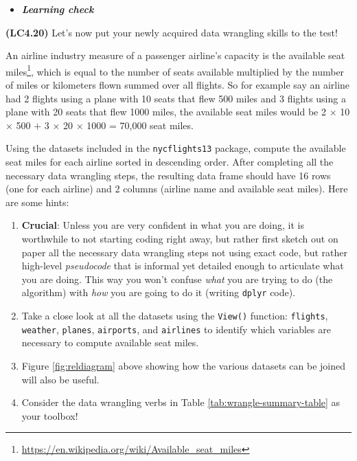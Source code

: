 \documentclass[12pt, krantz2,]{krantz}
\providecommand{\tightlist}{%
  \setlength{\itemsep}{0pt}\setlength{\parskip}{0pt}}
\renewcommand{\href}[2]{#2\footnote{\url{#1}}}
\newenvironment{rmdblock}[1]
  {\begin{shaded*}
  \begin{itemize}
  \renewcommand{\labelitemi}{
    \raisebox{-.7\height}[0pt][0pt]{
    }
  }
  \item
  }
  {
  \end{itemize}
  \end{shaded*}
  }
\newenvironment{learncheck}
  {\begin{rmdblock}{warning}}
  {\end{rmdblock}}
\begin{document}
\begin{learncheck}
\textbf{\emph{Learning check}}
\end{learncheck}

\textbf{(LC4.20)} Let's now put your newly acquired data wrangling skills to the test!

An airline industry measure of a passenger airline's capacity is the \href{https://en.wikipedia.org/wiki/Available_seat_miles}{available seat miles}, which is equal to the number of seats available multiplied by the number of miles or kilometers flown summed over all flights. So for example say an airline had 2 flights using a plane with 10 seats that flew 500 miles and 3 flights using a plane with 20 seats that flew 1000 miles, the available seat miles would be 2 \(\times\) 10 \(\times\) 500 \(+\) 3 \(\times\) 20 \(\times\) 1000 = 70,000 seat miles.

Using the datasets included in the \texttt{nycflights13} package, compute the available seat miles for each airline sorted in descending order. After completing all the necessary data wrangling steps, the resulting data frame should have 16 rows (one for each airline) and 2 columns (airline name and available seat miles). Here are some hints:

\begin{enumerate}
\def\labelenumi{\arabic{enumi}.}
\tightlist
\item
  \textbf{Crucial}: Unless you are very confident in what you are doing, it is worthwhile to not starting coding right away, but rather first sketch out on paper all the necessary data wrangling steps not using exact code, but rather high-level \emph{pseudocode} that is informal yet detailed enough to articulate what you are doing. This way you won't confuse \emph{what} you are trying to do (the algorithm) with \emph{how} you are going to do it (writing \texttt{dplyr} code).
\item
  Take a close look at all the datasets using the \texttt{View()} function: \texttt{flights}, \texttt{weather}, \texttt{planes}, \texttt{airports}, and \texttt{airlines} to identify which variables are necessary to compute available seat miles.
\item
  Figure \ref{fig:reldiagram} above showing how the various datasets can be joined will also be useful.
\item
  Consider the data wrangling verbs in Table \ref{tab:wrangle-summary-table} as your toolbox!
\end{enumerate}
\end{document}

